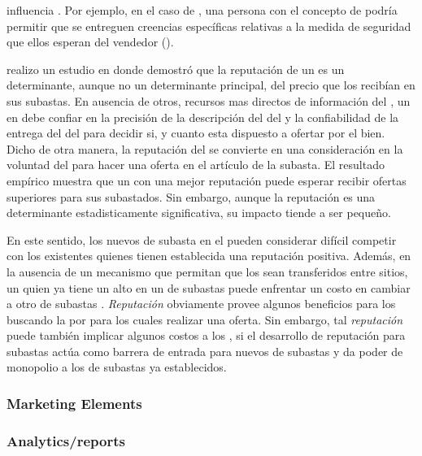 \security influencia \trust. Por ejemplo, en el caso de \amazon, una persona \familiarity con el concepto de \secureintcom podría permitir que se entreguen creencias específicas relativas a la medida de seguridad que ellos esperan del vendedor (\trust)\cite{gefen2000commerce}.

\ebay realizo un estudio en donde demostró que la reputación \ecommerce de un \seller es un determinante, aunque no un determinante principal, del precio que los \sellers recibían en sus subastas. En ausencia de otros, recursos mas directos de información del \itemsCommerce, un \consumer en \internet debe confiar en la precisión de la descripción del \itemsCommerce del \sellers y la confiabilidad de la entrega del \itemsCommerce del \sellers para decidir si, y cuanto esta dispuesto a ofertar por el bien. Dicho de otra manera, la reputación del \sellers se convierte en una consideración en la voluntad del \consumer para hacer una oferta en el artículo de la subasta. El resultado empírico muestra que un \seller con una mejor reputación puede esperar recibir ofertas superiores para sus \itemsCommerce subastados. Sin embargo, aunque la reputación es una determinante estadisticamente significativa, su impacto tiende a ser pequeño\cite{melnik2002does}.

En este sentido, los nuevos \seller de subasta en el \websites pueden considerar difícil competir con los \sellers existentes quienes tienen establecida una reputación positiva. Además, en la ausencia de un mecanismo que permitan que los \ratings sean transferidos entre sitios, un \seller quien ya tiene un alto \rating en un \website de subastas \online puede enfrentar un costo en cambiar a otro \website de subastas \online. \textit{Reputación} obviamente provee algunos beneficios para los \consumers buscando la \internet por \itemsCommerce para los cuales realizar una oferta. Sin embargo, tal \textit{reputación} puede también implicar algunos costos a los \consumers, si el desarrollo de reputación para subastas \online actúa como barrera de entrada para nuevos \websites de  subastas \online  y da poder de monopolio a los \websites de subastas \online ya establecidos\cite{melnik2002does}.

\subsubsection{Marketing Elements}

\subsubsection{Analytics/reports}





